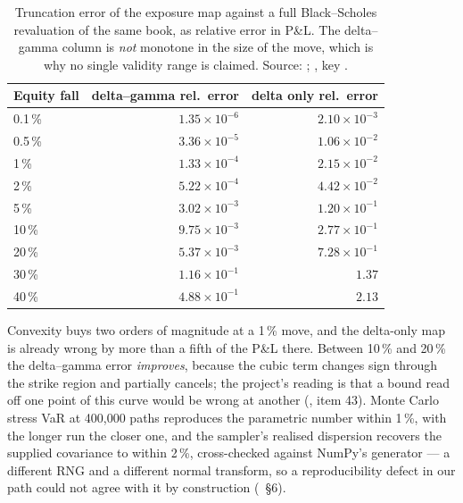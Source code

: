\documentclass[11pt,a4paper]{article}
\begin{document}
\begin{table}[t]
\caption[Truncation error of the exposure map against a full Black--Scholes revaluation o]{Truncation error of the exposure map against a full Black--Scholes revaluation of the
same book, as relative error in P\&L. The delta--gamma column is \emph{not} monotone in the
size of the move, which is why no single validity range is claimed. Source:
;
, key
.}
\label{tab:linear}
\centering\small
\begin{tabular}{lrr}
\toprule
Equity fall & delta--gamma rel.\ error & delta only rel.\ error \\
\midrule
0.1\,\% & $1.35\times 10^{-6}$ & $2.10\times 10^{-3}$ \\
0.5\,\% & $3.36\times 10^{-5}$ & $1.06\times 10^{-2}$ \\
1\,\%   & $1.33\times 10^{-4}$ & $2.15\times 10^{-2}$ \\
2\,\%   & $5.22\times 10^{-4}$ & $4.42\times 10^{-2}$ \\
5\,\%   & $3.02\times 10^{-3}$ & $1.20\times 10^{-1}$ \\
10\,\%  & $9.75\times 10^{-3}$ & $2.77\times 10^{-1}$ \\
20\,\%  & $5.37\times 10^{-3}$ & $7.28\times 10^{-1}$ \\
30\,\%  & $1.16\times 10^{-1}$ & $1.37$ \\
40\,\%  & $4.88\times 10^{-1}$ & $2.13$ \\
\bottomrule
\end{tabular}
\end{table}

Convexity buys two orders of magnitude at a 1\,\% move, and the delta-only map is already wrong
by more than a fifth of the P\&L there. Between 10\,\% and 20\,\% the delta--gamma error
\emph{improves}, because the cubic term changes sign through the strike region and partially
cancels; the project's reading is that a bound read off one point of this curve would be wrong
at another (, item 43). Monte Carlo stress VaR at 400{,}000 paths
reproduces the parametric number within 1\,\%, with the longer run the closer one, and the
sampler's realised dispersion recovers the supplied covariance to within 2\,\%, cross-checked
against NumPy's generator --- a different RNG and a different normal transform, so a
reproducibility defect in our path could not agree with it by construction
(~\S6).
\end{document}
